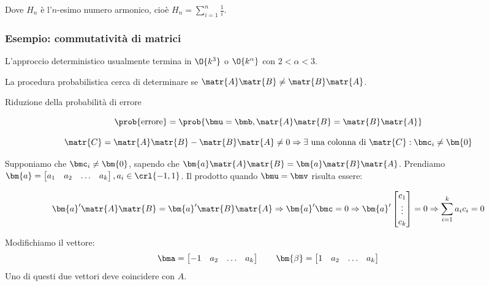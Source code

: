 \documentclass[\main/main.tex]{subfiles}
\begin{document}
Dove \(H_n\) è l'\(n\)-esimo numero armonico, cioè \(H_n = \sum_{i=1}^n \frac{1}{i}\).

\subsubsection{Esempio: commutatività di matrici}
L'approccio deterministico usualmente termina in \(\O{k^3}\) o \(\O{k^\alpha}\) con \(2 < \alpha < 3\).

La procedura probabilistica cerca di determinare se \(\matr{A}\matr{B} \neq \matr{B}\matr{A}\).


\IncMargin{1em}
\begin{algorithm}
	\BlankLine
	\caption{Riduzione della probabilità di errore}
\end{algorithm}\DecMargin{1em}

\[\prob{\text{errore}} = \prob{\bmu=\bmb, \matr{A}\matr{B} = \matr{B}\matr{A}}\]

\[
	\matr{C} = \matr{A}\matr{B} - \matr{B}\matr{A} \neq 0 \Rightarrow \exists \text{ una colonna di } \matr{C}: \bmc_i \neq \bm{0}
\]

Supponiamo che \(\bmc_i \neq \bm{0}\), sapendo che \(\bm{a}\matr{A}\matr{B} = \bm{a}\matr{B}\matr{A}\). Prendiamo \(\bm{a} = \begin{bmatrix}
	a_1 & a_2 & \ldots & a_k
\end{bmatrix}, a_i \in \crl{-1, 1}\). Il prodotto quando \(\bmu = \bmv \) risulta essere:

\[
	\bm{a}'\matr{A}\matr{B} = \bm{a}'\matr{B}\matr{A} \Rightarrow \bm{a}'\bmc = 0 \Rightarrow \bm{a}' \begin{bmatrix}
		c_1    \\
		\vdots \\
		c_k
	\end{bmatrix} = 0 \Rightarrow \sum_{i=1}^k a_i c_i = 0
\]

Modifichiamo il vettore:
\[
	\bma = \begin{bmatrix}
		-1 & a_2 & \ldots & a_k
	\end{bmatrix}
	\qquad
	\bm{\beta} = \begin{bmatrix}
		1 & a_2 & \ldots & a_k
	\end{bmatrix}
\]
Uno di questi due vettori deve coincidere con \(A\).
\end{document}
